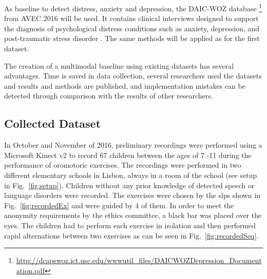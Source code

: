 As baseline to detect distress, anxiety and depression, the DAIC-WOZ database \footnote{ \url{http://dcapswoz.ict.usc.edu/wwwutil_files/DAICWOZDepression_Documentation.pdf}} from AVEC 2016 will be used. It contains clinical interviews designed to support the diagnosis of psychological distress conditions such as anxiety, depression, and post-traumatic stress disorder \cite{Valstar2016avec}. The same methods will be applied as for the first dataset.

The creation of a multimodal baseline using existing datasets has several advantages. Time is saved in data collection, several researchers used the datasets and results and methods are published, and implementation mistakes can be detected through comparison with the results of other researchers.


\subsection{Collected Dataset}
\label{subsec:collectedData}
In October and November of 2016, preliminary recordings were performed using a Microsoft Kinect v2 to record 67 children between the ages of 7 -11 during the performance of oromotoric exercises. The recordings were performed in two different elementary schools in Lisbon, always in a room of the school (see setup in Fig.~\ref{fig:setup}). Children without any prior knowledge of detected speech or language disorders were recorded. The exercises were chosen by the \glspl{slp} shown in Fig.~\ref{fig:recordedEx} and were guided by 4 of them. In order to meet the anonymity requirements by the ethics committee, a black bar was placed over the eyes. 
The children had to perform each exercise in isolation and then performed rapid alternations between two exercises as can be seen in Fig.~\ref{fig:recordedSeq}.

